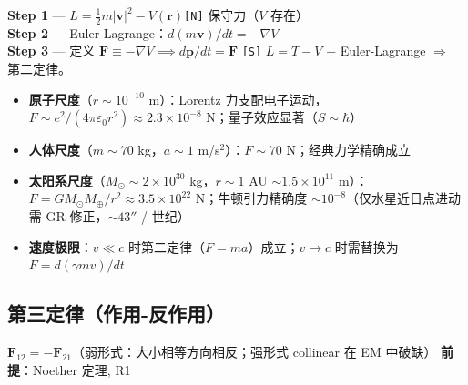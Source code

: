 \begin{derivationbox}[推导]
  \textbf{Step 1} — $L = \frac{1}{2}m|\mathbf{v}|^2 - V(\mathbf{r})$\quad\texttt{[N]} 保守力（$V$ 存在）\\
  \textbf{Step 2} — Euler-Lagrange：$d(m\mathbf{v})/dt = -\nabla V$\\
  \textbf{Step 3} — 定义 $\mathbf{F} \equiv -\nabla V \implies d\mathbf{p}/dt = \mathbf{F}$
  \quad\texttt{[S]} $L = T-V$ + Euler-Lagrange $\Rightarrow$ 第二定律。
\end{derivationbox}



\begin{oombox}[第二定律的尺度范围]
  \begin{itemize}
    \item \textbf{原子尺度}（$r \sim 10^{-10}$ m）：Lorentz 力支配电子运动，$F \sim e^2/(4\pi\varepsilon_0 r^2) \approx 2.3 \times 10^{-8}$ N；量子效应显著（$S \sim \hbar$）
    \item \textbf{人体尺度}（$m \sim 70$ kg，$a \sim 1$ m/s$^2$）：$F \sim 70$ N；经典力学精确成立
    \item \textbf{太阳系尺度}（$M_\odot \sim 2\times10^{30}$ kg，$r \sim 1$ AU $\sim 1.5\times10^{11}$ m）：$F = GM_\odot M_\oplus/r^2 \approx 3.5\times10^{22}$ N；牛顿引力精确度 $\sim 10^{-8}$（仅水星近日点进动需 GR 修正，$\sim 43''$ / 世纪）
    \item \textbf{速度极限}：$v \ll c$ 时第二定律（$F=ma$）成立；$v \to c$ 时需替换为 $F = d(\gamma mv)/dt$
  \end{itemize}
\end{oombox}

\subsection{第三定律（作用-反作用）}

\begin{lawbox}
  $\mathbf{F}_{12} = -\mathbf{F}_{21}$（弱形式：大小相等方向相反；强形式 collinear 在 EM 中破缺）
  \quad\textbf{前提}：Noether 定理, R1
\end{lawbox}

